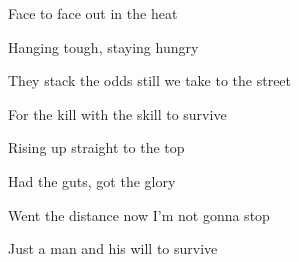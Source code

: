 \begin{song}
\bigskip

 Face to face out in the heat \par
{} Hanging tough, staying hungry \par
{} They stack the odds still we take to the street \par
For the kill with the skill to survive \par

\bigskip

\Chorus

\bigskip

 Rising up straight to the top \par
{} Had the guts, got the glory \par
{} Went the distance now I’m not gonna stop \par
Just a man and his will to survive \par

\bigskip

\Chorus \par
{} \par

\end{song}

